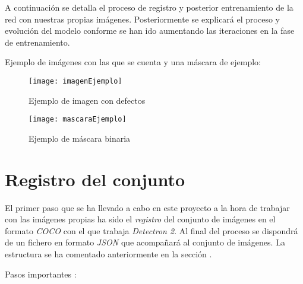 A continuación se detalla el proceso de registro y posterior entrenamiento de la red con nuestras propias imágenes. Posteriormente se explicará el proceso y evolución del modelo conforme se han ido aumentando las iteraciones en la fase de entrenamiento.

Ejemplo de imágenes con las que se cuenta y una máscara de ejemplo:

       \begin{figure}[htb]
    	\centering
    	\texttt{[image: imagenEjemplo]}
    	\caption[Ejemplo de imagen con defectos]{Ejemplo de imagen con defectos}
        \end{figure}
        
        \begin{figure}[htb]
    	\centering
    	\texttt{[image: mascaraEjemplo]}
    	\caption[Ejemplo de máscara binaria]{Ejemplo de máscara binaria}
        \end{figure}


\section{Registro del conjunto}

El primer paso que se ha llevado a cabo en este proyecto a la hora de trabajar con las imágenes propias ha sido el \emph{registro} del conjunto de imágenes en el formato \emph{COCO} con el que trabaja \emph{Detectron 2}. Al final del proceso se dispondrá de un fichero en formato \emph{JSON} que acompañará al conjunto de imágenes.
La estructura se ha comentado anteriormente en la sección .

Pasos importantes :

